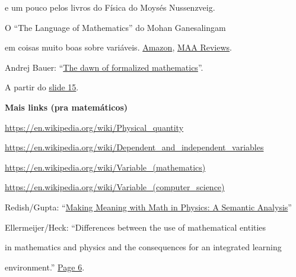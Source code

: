 \documentclass[oneside,12pt]{article}
\begin{document}

e um pouco pelos livros do Física do Moysés Nussenzveig.

\bsk

O ``The Language of Mathematics'' do Mohan Ganesalingam 

em coisas muito boas sobre variáveis.
\href{https://www.amazon.com/Language-Mathematics-Linguistic-Philosophical-Investigation/dp/364237011X}{Amazon},
\href{https://www.maa.org/press/maa-reviews/the-language-of-mathematics}{MAA
  Reviews}.


\bsk

Andrej Bauer: ``\href{http://math.andrej.com/2021/06/24/the-dawn-of-formalized-mathematics/}{The
  dawn of formalized mathematics}''.

A partir do
\href{http://math.andrej.com/asset/data/the-dawn-of-formalized-mathematics.pdf\#page=15}{slide
  15}.



\newpage

{\bf Mais links (pra matemáticos)}

\bsk

{\footnotesize

\url{https://en.wikipedia.org/wiki/Physical_quantity}

\url{https://en.wikipedia.org/wiki/Dependent_and_independent_variables}

\url{https://en.wikipedia.org/wiki/Variable_(mathematics)}

\url{https://en.wikipedia.org/wiki/Variable_(computer_science)}

\msk

%
Redish/Gupta: ``\href{https://arxiv.org/pdf/1002.0472.pdf}{Making
  Meaning with Math in Physics: A Semantic Analysis}''

\msk

Ellermeijer/Heck: ``Differences between the use of mathematical entities

in mathematics and physics and the consequences for an integrated learning

environment.''
\href{https://staff.fnwi.uva.nl/a.j.p.heck/research/art/girep2001.pdf\#page=6}{Page
  6}.

}



\newpage

\end{document}
